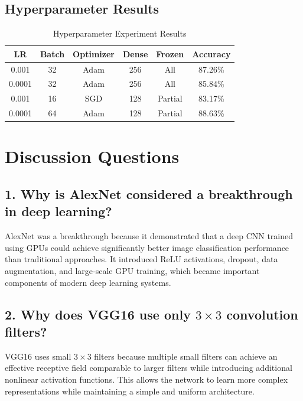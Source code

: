 \documentclass[12pt,a4paper]{article}
\begin{document}
\subsection{Hyperparameter Results}

\begin{table}[H]
\centering
\caption{Hyperparameter Experiment Results}
\begin{tabular}{cccccc}
\toprule
\textbf{LR} & \textbf{Batch} & \textbf{Optimizer} &
\textbf{Dense} & \textbf{Frozen} & \textbf{Accuracy} \\
\midrule
0.001 & 32 & Adam & 256 & All & 87.26\% \\
0.0001 & 32 & Adam & 256 & All & 85.84\% \\
0.001 & 16 & SGD & 128 & Partial & 83.17\% \\
0.0001 & 64 & Adam & 128 & Partial & 88.63\% \\
\bottomrule
\end{tabular}
\end{table}


\section{Discussion Questions}

\subsection{1. Why is AlexNet considered a breakthrough in deep learning?}

AlexNet was a breakthrough because it demonstrated that a deep CNN trained using GPUs could achieve significantly better image classification performance than traditional approaches. It introduced ReLU activations, dropout, data augmentation, and large-scale GPU training, which became important components of modern deep learning systems.

\subsection{2. Why does VGG16 use only $3\times3$ convolution filters?}

VGG16 uses small $3\times3$ filters because multiple small filters can achieve an effective receptive field comparable to larger filters while introducing additional nonlinear activation functions. This allows the network to learn more complex representations while maintaining a simple and uniform architecture.
\end{document}
